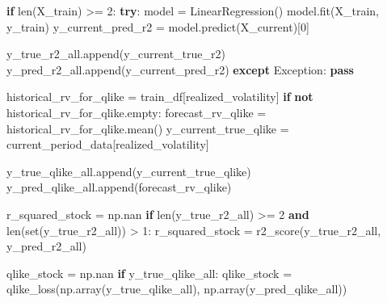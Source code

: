 \documentclass[
  letterpaper,
  DIV=11,
  numbers=noendperiod]{scrartcl}
\newenvironment{Shaded}{\begin{snugshade}}{\end{snugshade}}
\newcommand{\BuiltInTok}[1]{\textcolor[rgb]{0.00,0.23,0.31}{#1}}
\newcommand{\ControlFlowTok}[1]{\textcolor[rgb]{0.00,0.23,0.31}{\textbf{#1}}}
\newcommand{\DecValTok}[1]{\textcolor[rgb]{0.68,0.00,0.00}{#1}}
\newcommand{\KeywordTok}[1]{\textcolor[rgb]{0.00,0.23,0.31}{\textbf{#1}}}
\newcommand{\NormalTok}[1]{\textcolor[rgb]{0.00,0.23,0.31}{#1}}
\newcommand{\OperatorTok}[1]{\textcolor[rgb]{0.37,0.37,0.37}{#1}}
\newcommand{\PreprocessorTok}[1]{\textcolor[rgb]{0.68,0.00,0.00}{#1}}
\newcommand{\StringTok}[1]{\textcolor[rgb]{0.13,0.47,0.30}{#1}}
\begin{document}
\begin{Shaded}
\begin{Highlighting}[]
        \ControlFlowTok{if} \BuiltInTok{len}\NormalTok{(X\_train) }\OperatorTok{\textgreater{}=} \DecValTok{2}\NormalTok{: }
            \ControlFlowTok{try}\NormalTok{:}
\NormalTok{                model }\OperatorTok{=}\NormalTok{ LinearRegression()}
\NormalTok{                model.fit(X\_train, y\_train)}
\NormalTok{                y\_current\_pred\_r2 }\OperatorTok{=}\NormalTok{ model.predict(X\_current)[}\DecValTok{0}\NormalTok{]}
                
\NormalTok{                y\_true\_r2\_all.append(y\_current\_true\_r2)}
\NormalTok{                y\_pred\_r2\_all.append(y\_current\_pred\_r2)}
            \ControlFlowTok{except} \PreprocessorTok{Exception}\NormalTok{:}
                \ControlFlowTok{pass}

\NormalTok{        historical\_rv\_for\_qlike }\OperatorTok{=}\NormalTok{ train\_df[}\StringTok{\textquotesingle{}realized\_volatility\textquotesingle{}}\NormalTok{]}
        \ControlFlowTok{if} \KeywordTok{not}\NormalTok{ historical\_rv\_for\_qlike.empty:}
\NormalTok{            forecast\_rv\_qlike }\OperatorTok{=}\NormalTok{ historical\_rv\_for\_qlike.mean()}
\NormalTok{            y\_current\_true\_qlike }\OperatorTok{=}\NormalTok{ current\_period\_data[}\StringTok{\textquotesingle{}realized\_volatility\textquotesingle{}}\NormalTok{]}

\NormalTok{            y\_true\_qlike\_all.append(y\_current\_true\_qlike)}
\NormalTok{            y\_pred\_qlike\_all.append(forecast\_rv\_qlike)}

\NormalTok{    r\_squared\_stock }\OperatorTok{=}\NormalTok{ np.nan}
    \ControlFlowTok{if} \BuiltInTok{len}\NormalTok{(y\_true\_r2\_all) }\OperatorTok{\textgreater{}=} \DecValTok{2} \KeywordTok{and} \BuiltInTok{len}\NormalTok{(}\BuiltInTok{set}\NormalTok{(y\_true\_r2\_all)) }\OperatorTok{\textgreater{}} \DecValTok{1}\NormalTok{: }
\NormalTok{        r\_squared\_stock }\OperatorTok{=}\NormalTok{ r2\_score(y\_true\_r2\_all, y\_pred\_r2\_all)}
    
\NormalTok{    qlike\_stock }\OperatorTok{=}\NormalTok{ np.nan}
    \ControlFlowTok{if}\NormalTok{ y\_true\_qlike\_all:}
\NormalTok{        qlike\_stock }\OperatorTok{=}\NormalTok{ qlike\_loss(np.array(y\_true\_qlike\_all), np.array(y\_pred\_qlike\_all))}


\end{Highlighting}
\end{Shaded}
\end{document}
